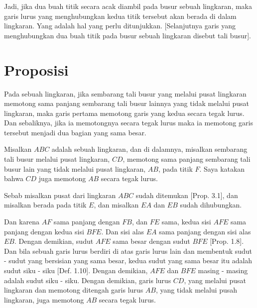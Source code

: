 \documentclass[a4paper]{book}
\begin{document}
Jadi, jika dua buah titik secara acak diambil pada busur sebuah lingkaran, maka
garis lurus yang menghubungkan kedua titik tersebut akan berada di dalam 
lingkaran. Yang adalah hal yang perlu ditunjukkan. [Selanjutnya garis
yang menghubungkan dua buah titik pada busur sebuah lingkaran disebut
tali busur].

\section*{\centering Proposisi \thesection}
Pada sebuah lingkaran, jika sembarang tali busur yang melalui pusat lingkaran
memotong sama panjang sembarang tali busur lainnya yang tidak melalui 
pusat 
lingkaran, maka garis pertama memotong garis yang kedua secara tegak lurus.
Dan sebaliknya, jika ia memotongnya secara tegak lurus maka ia memotong garis
tersebut menjadi dua bagian yang sama besar.

\begin{center}
\end{center}

Misalkan $ABC$ adalah sebuah lingkaran, dan di dalamnya, misalkan sembarang 
tali busur melalui pusat lingkaran, $CD$, memotong sama panjang 
sembarang tali
busur lain yang tidak melalui pusat lingkaran, $AB$, pada titik $F$. 
Saya katakan bahwa $CD$ juga memotong $AB$ secara tegak lurus.

Sebab misalkan pusat dari lingkaran $ABC$ sudah ditemukan [Prop. 3.1], dan 
misalkan berada pada titik $E$, dan misalkan $EA$ dan $EB$ sudah dihubungkan.

Dan karena $AF$ sama panjang dengan $FB$, dan $FE$ sama, kedua sisi
$AFE$ sama panjang dengan kedua sisi $BFE$. Dan sisi alas $EA$ sama panjang 
dengan sisi alas $EB$. Dengan demikian, sudut $AFE$ sama besar dengan sudut
$BFE$ [Prop. 1.8]. Dan bila sebuah garis lurus berdiri di atas garis lurus lain
dan membentuk sudut - sudut yang bersisian yang sama besar, kedua sudut yang
sama besar itu adalah sudut siku - siku [Def. 1.10]. Dengan demikian, $AFE$ dan
$BFE$ masing - masing adalah sudut siku - siku. Dengan demikian, garis lurus
$CD$, yang melalui pusat lingkaran dan memotong ditengah garis lurus $AB$, yang
tidak melalui pusah lingkaran, juga memotong $AB$ secara tegak lurus.
\end{document}
